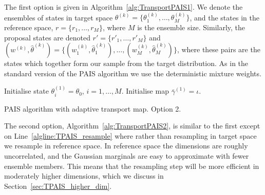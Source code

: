 \documentclass[final]{siamltex}
\begin{document}
The first option is given in Algorithm~\ref{alg:TransportPAIS1}. We
denote the ensembles of states in target space $\theta^{(k)} =
\{\theta^{(k)}_1,\dots,\theta^{(k)}_M\}$, and the states in the
reference space, $r = \{r_1,\dots,r_M\}$, where $M$ is the ensemble
size. Similarly, the proposal states are denoted $r' =
\{r'_1,\dots,r'_M\}$ and $(w^{(k)}, \hat{\theta}^{(k)}) =
\{(w^{(k)}_1, \hat{\theta}^{(k)}_1),\dots,(w^{(k)}_M,
\hat{\theta}^{(k)}_M)\}$, where these pairs are the states which
together form our sample from the target distribution. As in the standard version of the PAIS algorithm we use the deterministic mixture weights.

\begin{table}
\begin{algorithm}[H]
\DontPrintSemicolon
\BlankLine
Initialise state $\theta^{(1)}_i = \theta_0$, \quad $i = 1,\dots,M$.\;
Initialise map $\bar{\gamma}^{(1)} = \iota$.\;
\caption{PAIS algorithm with adaptive transport map. Option 2.\label{alg:TransportPAIS2}}
\end{algorithm}
\end{table}

The second option, Algorithm~\ref{alg:TransportPAIS2}, is similar to
the first except on Line~\ref{algline:TPAIS_resample} where rather
than resampling in target space we resample in reference space. In
reference space the dimensions are roughly uncorrelated, and the
Gaussian marginals are easy to approximate with fewer ensemble
members. This means that the resampling step will be more efficient in
moderately higher dimensions, which we discuss in Section~\ref{sec:TPAIS_higher_dim}.
\end{document}

